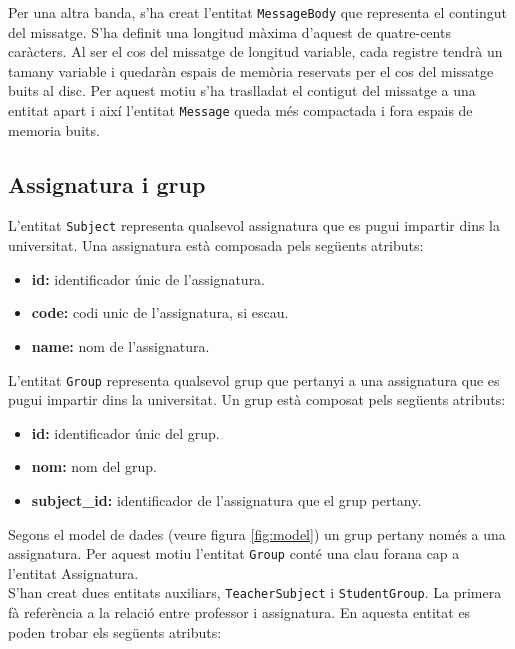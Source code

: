    	Per una altra banda, s'ha creat l'entitat \texttt{MessageBody} que representa el contingut del missatge. S'ha definit una longitud màxima d'aquest de quatre-cents caràcters. Al ser el cos del missatge de longitud variable, cada registre tendrà un tamany variable i quedaràn espais de memòria reservats per el cos del missatge buits al disc. Per aquest motiu s'ha traslladat el contigut del missatge a una entitat apart i així l'entitat \texttt{Message} queda més compactada i fora espais de memoria buits.\\
   	
   	\subsection{Assignatura i grup}
   	
   	L'entitat \texttt{Subject} representa qualsevol assignatura que es pugui impartir dins la universitat. Una assignatura està composada pels següents atributs:
   	
   	\begin{itemize}
   		\item \textbf{id:} identificador únic de l'assignatura.
   		\item \textbf{code:} codi unic de l'assignatura, si escau.
   		\item \textbf{name:} nom de l'assignatura.
   	\end{itemize}
   	
   	L'entitat \texttt{Group} representa qualsevol grup que pertanyi a una assignatura que es pugui impartir dins la universitat. Un grup està composat pels següents atributs:
   	
   	\begin{itemize}
   		\item \textbf{id:} identificador únic del grup.
   		\item \textbf{nom:} nom del grup.
   		\item \textbf{subject\_id:} identificador de l'assignatura que el grup pertany. 
   	\end{itemize}
   	
   	Segons el model de dades (veure figura \ref{fig:model}) un grup pertany només a una assignatura. Per aquest motiu l'entitat \texttt{Group} conté una clau forana cap a l'entitat Assignatura.\\
   	
   	S'han creat dues entitats auxiliars, \texttt{TeacherSubject} i \texttt{StudentGroup}. La primera fà referència a la relació entre professor i assignatura. En aquesta entitat es poden trobar els següents atributs:
   	
